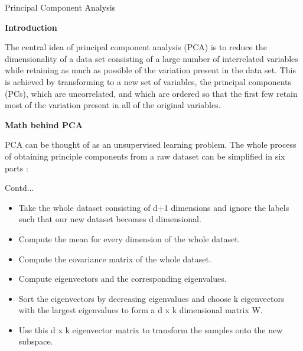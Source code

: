 \documentclass{beamer}
\newcommand\myheading[1]{%
  \par\bigskip
  {\Large\bfseries#1}\par\smallskip}
\begin{document}
\begin{frame}{Principal Component Analysis}
	\begin{flushleft}
	\myheading{Introduction}
	The central idea of principal component analysis (PCA) is to reduce the dimensionality of a data set consisting of a large number of interrelated variables while retaining as much as possible of the variation present in the data set. This is achieved by transforming to a new set of variables, the principal components (PCs), which are uncorrelated, and which are ordered so that the first few retain most of the variation present in all of the original variables.\\
\vspace{10pt}
\myheading{Math behind PCA}
PCA can be thought of as an unsupervised learning problem. The whole process of obtaining principle components from a raw dataset can be simplified in six parts :
	\end{flushleft}
\end{frame}

\begin{frame}{Contd...}
	\begin{flushleft}
	\begin{itemize}
		\item Take the whole dataset consisting of d+1 dimensions and ignore the labels such that our new dataset becomes d dimensional.
		\item Compute the mean for every dimension of the whole dataset.
		\item Compute the covariance matrix of the whole dataset.
		\item Compute eigenvectors and the corresponding eigenvalues.
		\item Sort the eigenvectors by decreasing eigenvalues and choose k eigenvectors with the largest eigenvalues to form a d x k dimensional matrix W.
		\item Use this d x k eigenvector matrix to transform the samples onto the new subspace.
	\end{itemize}
\end{flushleft}
\end{frame}
\end{document}
